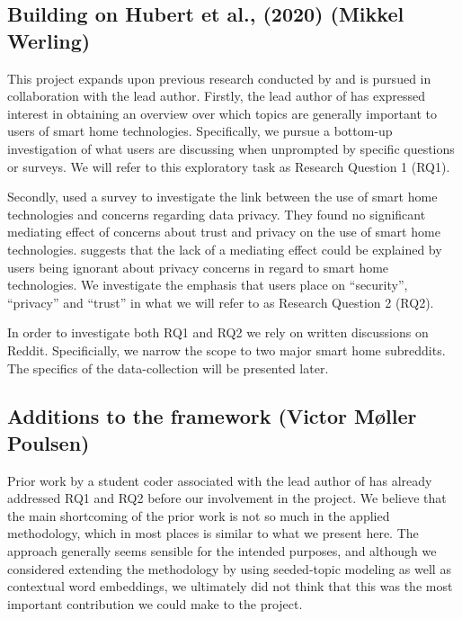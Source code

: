 \documentclass{article}
\begin{document}
    \subsection{Building on Hubert et al., (2020) (Mikkel Werling)}
    This project expands upon previous research conducted by  and is pursued in collaboration with the lead author. Firstly, the lead author of  has expressed interest in obtaining an overview over which topics are generally important to users of smart home technologies. Specifically, we pursue a bottom-up investigation of what users are discussing when unprompted by specific questions or surveys. We will refer to this exploratory task as Research Question 1 (RQ1). 

Secondly,  used a survey to investigate the link between the use of smart home technologies and concerns regarding data privacy. They found no significant mediating effect of concerns about trust and privacy on the use of smart home technologies.  suggests that the lack of a mediating effect could be explained by users being ignorant about privacy concerns in regard to smart home technologies. We investigate the emphasis that users place on “security”, “privacy” and “trust” in what we will refer to as Research Question 2 (RQ2). 

In order to investigate both RQ1 and RQ2 we rely on written discussions on Reddit. Specificially, we narrow the scope to two major smart home subreddits. The specifics of the data-collection will be presented later. 

    \subsection{Additions to the framework (Victor Møller Poulsen)}
    Prior work by a student coder associated with the lead author of  has already addressed RQ1 and RQ2 before our involvement in the project. We believe that the main shortcoming of the prior work is not so much in the applied methodology, which in most places is similar to what we present here. The approach generally seems sensible for the intended purposes, and although we considered extending the methodology by using seeded-topic modeling as well as contextual word embeddings, we ultimately did not think that this was the most important contribution we could make to the project. 
\end{document}
